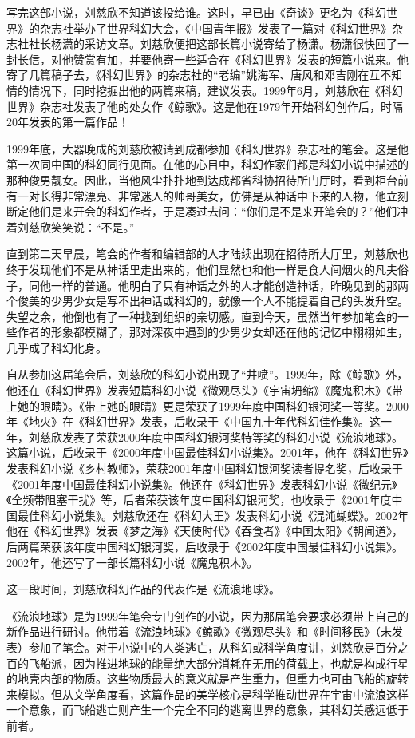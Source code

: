 \documentclass[fontset=fandol,12pt,a5paper]{ctexbook}
\begin{document}
写完这部小说，刘慈欣不知道该投给谁。这时，早已由《奇谈》更名为《科幻世界》的杂志社举办了世界科幻大会，《中国青年报》发表了一篇对《科幻世界》杂志社社长杨潇的采访文章。刘慈欣便把这部长篇小说寄给了杨潇。杨潇很快回了一封长信，对他赞赏有加，并要他寄一些适合在《科幻世界》发表的短篇小说来。他寄了几篇稿子去，《科幻世界》的杂志社的“老编”姚海军、唐风和邓吉刚在互不知情的情况下，同时挖掘出他的两篇来稿，建议发表。1999年6月，刘慈欣在《科幻世界》杂志社发表了他的处女作《鲸歌》。这是他在1979年开始科幻创作后，时隔20年发表的第一篇作品！

1999年底，大器晚成的刘慈欣被请到成都参加《科幻世界》杂志社的笔会。这是他第一次同中国的科幻同行见面。在他的心目中，科幻作家们都是科幻小说中描述的那种俊男靓女。因此，当他风尘扑扑地到达成都省科协招待所门厅时，看到柜台前有一对长得非常漂亮、非常迷人的帅哥美女，仿佛是从神话中下来的人物，他立刻断定他们是来开会的科幻作者，于是凑过去问：“你们是不是来开笔会的？”他们冲着刘慈欣笑笑说：“不是。”

直到第二天早晨，笔会的作者和编辑部的人才陆续出现在招待所大厅里，刘慈欣也终于发现他们不是从神话里走出来的，他们显然也和他一样是食人间烟火的凡夫俗子，同他一样的普通。他明白了只有神话之外的人才能创造神话，昨晚见到的那两个俊美的少男少女是写不出神话或科幻的，就像一个人不能提着自己的头发升空。失望之余，他倒也有了一种找到组织的亲切感。直到今天，虽然当年参加笔会的一些作者的形象都模糊了，那对深夜中遇到的少男少女却还在他的记忆中栩栩如生，几乎成了科幻化身。

自从参加这届笔会后，刘慈欣的科幻小说出现了“井喷”。1999年，除《鲸歌》外，他还在《科幻世界》发表短篇科幻小说《微观尽头》《宇宙坍缩》《魔鬼积木》《带上她的眼睛》。《带上她的眼睛》更是荣获了1999年度中国科幻银河奖一等奖。2000年《地火》在《科幻世界》发表，后收录于《中国九十年代科幻佳作集》。这一年，刘慈欣发表了荣获2000年度中国科幻银河奖特等奖的科幻小说《流浪地球》。这篇小说，后收录于《2000年度中国最佳科幻小说集》。2001年，他在《科幻世界》发表科幻小说《乡村教师》，荣获2001年度中国科幻银河奖读者提名奖，后收录于《2001年度中国最佳科幻小说集》。他还在《科幻世界》发表科幻小说《微纪元》《全频带阻塞干扰》等，后者荣获该年度中国科幻银河奖，也收录于《2001年度中国最佳科幻小说集》。刘慈欣还在《科幻大王》发表科幻小说《混沌蝴蝶》。2002年他在《科幻世界》发表《梦之海》《天使时代》《吞食者》《中国太阳》《朝闻道》，后两篇荣获该年度中国科幻银河奖，后收录于《2002年度中国最佳科幻小说集》。2002年，他还写了一部长篇科幻小说《魔鬼积木》。

这一段时间，刘慈欣科幻作品的代表作是《流浪地球》。

《流浪地球》是为1999年笔会专门创作的小说，因为那届笔会要求必须带上自己的新作品进行研讨。他带着《流浪地球》《鲸歌》《微观尽头》和《时间移民》（未发表）参加了笔会。对于小说中的人类逃亡，从科幻或科学角度讲，刘慈欣是百分之百的飞船派，因为推进地球的能量绝大部分消耗在无用的荷载上，也就是构成行星的地壳内部的物质。这些物质最大的意义就是产生重力，但重力也可由飞船的旋转来模拟。但从文学角度看，这篇作品的美学核心是科学推动世界在宇宙中流浪这样一个意象，而飞船逃亡则产生一个完全不同的逃离世界的意象，其科幻美感远低于前者。
\end{document}

